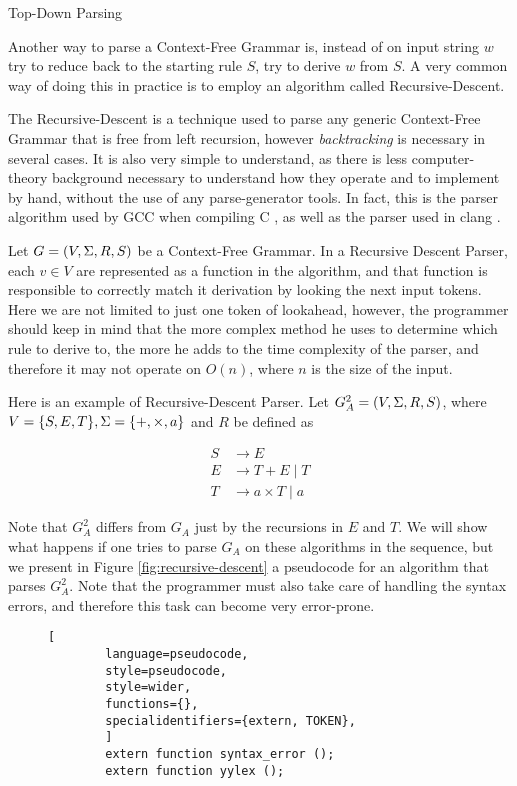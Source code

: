 \begin{section}{Top-Down Parsing}

Another way to parse a Context-Free Grammar is, instead of on input string $w$
try to reduce back to the starting rule $S$, try to derive $w$ from $S$.
A very common way of doing this in practice is to employ an algorithm called
Recursive-Descent.

The Recursive-Descent is a technique used to parse any generic Context-Free
Grammar that is free from left recursion, however \textit{backtracking} is
necessary in several cases. It is also very simple to understand, as there is
less computer-theory background necessary to understand how they operate and to
implement by hand, without the use of any parse-generator tools. In fact, this
is the parser algorithm used by GCC when compiling C \citep{myers_parser}, as
well as the parser used in clang \citep{clang_parser}. 

Let $G = (V, \Sigma, R, S)$ be a Context-Free Grammar. In a Recursive Descent
Parser, each $v \in V$ are represented as a function in the algorithm, and
that function is responsible to correctly match it derivation by looking
the next input tokens. Here we are not limited to just one token of lookahead,
however, the programmer should keep in mind that the more complex method
he uses to determine which rule to derive to, the more he adds to the
time complexity of the parser, and therefore it may not operate on $O(n)$,
where $n$ is the size of the input.

Here is an example of Recursive-Descent Parser. Let $G_A^2 = (V, \Sigma, R, S)$,
where $V = \{S, E, T\}, \Sigma = \{+, \times, a\}$ and $R$ be defined as

\begin{align}
S &\rightarrow E \nonumber \\
E &\rightarrow T + E \; | \; T  \nonumber \\
T &\rightarrow a \times T \; | \; a \nonumber
\end{align}

Note that $G_A^2$ differs from $G_A$ just by the recursions in $E$ and $T$. We
will show what happens if one tries to parse $G_A$ on these algorithms in the
sequence, but we present in Figure \ref{fig:recursive-descent} a pseudocode for
an algorithm that parses $G_A^2$. Note that the programmer must also take care
of handling the syntax errors, and therefore this task can become very
error-prone.


\begin{figure}[ht]
	\centering
	\begin{lstlisting}[
		language=pseudocode,
		style=pseudocode,
		style=wider,
		functions={},
		specialidentifiers={extern, TOKEN},
		]
		extern function syntax_error ();
		extern function yylex ();


\end{lstlisting}
\end{figure}
\end{section}

